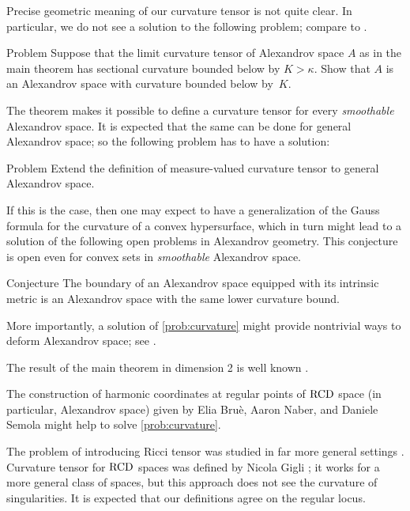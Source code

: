 Precise geometric meaning of our curvature tensor is not quite clear. 
In particular, we do not see a solution to the following problem;
compare to \cite[Conjecture~1.1]{G}.

\begin{thm}{Problem}
Suppose that the limit curvature tensor of Alexandrov space $A$ as in the main theorem has sectional curvature bounded below by $K>\kappa$.
Show that $A$ is an Alexandrov space with curvature bounded below by~$K$.
\end{thm}

The theorem makes it possible to define a curvature tensor for every \emph{smoothable} Alexandrov space.
It is expected that the same can be done for general Alexandrov space; so the following problem has to have a solution:

\begin{thm}{Problem}\label{prob:curvature}
Extend the definition of measure-valued curvature tensor to general Alexandrov space.
\end{thm}

If this is the case, then one may expect to have a generalization of the Gauss formula for the curvature of a convex hypersurface, which in turn might lead to a solution of the following open problems in Alexandrov geometry.
This conjecture is open even for convex sets in \emph{smoothable} Alexandrov space.

\begin{thm}{Conjecture}
The boundary of an Alexandrov space equipped with its intrinsic metric is an Alexandrov space with the same lower curvature bound.
\end{thm}

More importantly, a solution of \ref{prob:curvature} might provide nontrivial ways to deform Alexandrov space; see \cite[Section 9]{petrunin-conc}. 

The result of the main theorem in dimension 2 is well known \cite[VII \S13]{AZ}.

The construction of harmonic coordinates at regular points of $\operatorname{RCD}$ space (in particular, Alexandrov space) given by Elia Bruè, Aaron Naber, and Daniele Semola \cite{BNS} might help to solve \ref{prob:curvature}.

The problem of introducing Ricci tensor
was studied in far more general settings \cite{G1,St,H,L}.
Curvature tensor for $\operatorname{RCD}$ spaces was defined by Nicola Gigli \cite{G};
it works for a more general class of spaces, but this approach does not see the curvature of singularities.
It is expected that our definitions agree on the regular locus.

